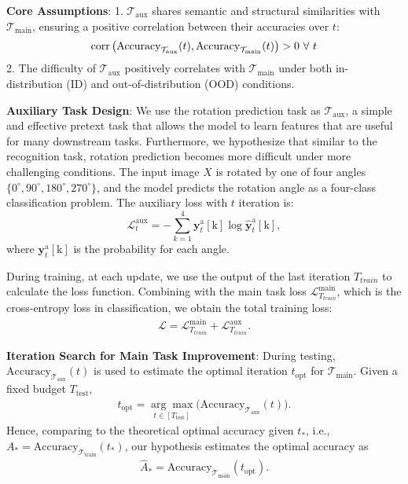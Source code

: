 \textbf{Core Assumptions}:  
1. \( \mathcal{T}_\text{aux} \) shares semantic and structural similarities with \( \mathcal{T}_\text{main} \), ensuring a positive correlation between their accuracies over \( t \):  
   \[
   \textnormal{corr}\left(\text{Accuracy}_{\mathcal{T}_\text{aux}}(t), \text{Accuracy}_{\mathcal{T}_\text{main}}(t)\right) > 0 \ \forall\ t
   \]
2. The difficulty of \( \mathcal{T}_\text{aux} \) positively correlates with \( \mathcal{T}_\text{main} \) under both in-distribution (ID) and out-of-distribution (OOD) conditions. 

\textbf{Auxiliary Task Design}: 
We use the rotation prediction task \cite{Balaji2018MetaRegTD} as \( \mathcal{T}_\text{aux} \), a simple and effective pretext task that allows the model to learn features that are useful for many downstream tasks. 
Furthermore, we hypothesize that similar to the recognition task, rotation prediction becomes more difficult under more challenging conditions. 
The input image \( X \) is rotated by one of four angles \( \{0^\circ, 90^\circ, 180^\circ, 270^\circ\} \), and the model predicts the rotation angle as a four-class classification problem.
The auxiliary loss with $t$ iteration is:
\[
\mathcal{L}_t^{\text{aux}} = -\sum_{k=1}^{4} \mathbf{y}_t^{\text{a}}[\text{k}] \log \hat{\mathbf{y}}_t^{\text{a}}[\text{k}],
\]
where $\mathbf{y}_t^{\text{a}}[\text{k}]$ is the probability for each angle.

During training, at each update, we use the output of the last iteration $T_{train}$ to calculate the loss function. 
Combining with the main task loss \( \mathcal{L}_{T_{train}}^\text{main} \), which is the cross-entropy loss in classification, we obtain the total training loss:
\begin{align}
    \mathcal{L} = \mathcal{L}_{T_{train}}^\text{main} + \mathcal{L}_{T_{train}}^\text{aux}.
\end{align}

\textbf{Iteration Search for Main Task Improvement}:  
During testing, \( \text{Accuracy}_{\mathcal{T}_\text{aux}}(t) \) is used to estimate the optimal iteration \( t_\text{opt} \) for \( \mathcal{T}_\text{main} \). 
Given a fixed budget $T_{\text{test}}$,
\begin{align}
    t_\text{opt} = \underset{{t\in[T_{\text{test}}]}}{\arg\max} \big(\text{Accuracy}_{\mathcal{T}_\text{aux}}(t)\big).
\end{align}
Hence, comparing to the theoretical optimal accuracy given $t_*$, i.e., $A_*=\text{Accuracy}_{\mathcal{T}_\text{train}}(t_*)$, our hypothesis estimates the optimal accuracy as
\begin{align}
    \hat{A}_* = \text{Accuracy}_{\mathcal{T}_\text{main}}(t_\text{opt}).
\end{align}

